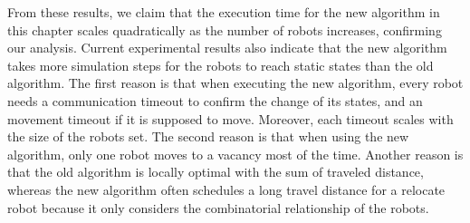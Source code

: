 From these results, we claim that the execution time for the new
algorithm in this chapter scales quadratically as the number of robots increases,
confirming our analysis.  
  Current experimental results also indicate that
  the new algorithm takes more simulation steps for the robots to reach
  static states than the old algorithm. 
  The first reason is that when
  executing the new algorithm, every robot needs a communication timeout
  to confirm the change of its states, and an movement timeout if it is
  supposed to move. 
  Moreover, each timeout scales with the size of the
  robots set. 
  The second reason is that when using the new algorithm,
  only one robot moves to a vacancy most of the time. 
  Another reason is
  that the old algorithm is locally optimal with the sum of traveled
  distance, whereas the new algorithm often schedules a long travel distance for a relocate robot because it only considers the combinatorial
  relationship of the robots.

